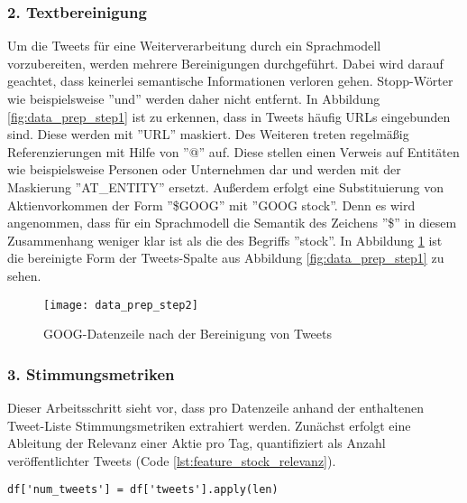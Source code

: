 \subsubsection*{2. Textbereinigung}
Um die Tweets für eine Weiterverarbeitung durch ein Sprachmodell vorzubereiten, werden mehrere Bereinigungen durchgeführt. Dabei wird darauf geachtet, dass keinerlei semantische Informationen verloren gehen. Stopp-Wörter wie beispielsweise ''und'' werden daher nicht entfernt.
In Abbildung \ref{fig:data_prep_step1} ist zu erkennen, dass in Tweets häufig URLs eingebunden sind. Diese werden mit ''URL'' maskiert.
Des Weiteren treten regelmäßig Referenzierungen mit Hilfe von ''@'' auf. Diese stellen einen Verweis auf Entitäten wie beispielsweise Personen oder Unternehmen dar und werden mit der Maskierung ''AT\_ENTITY'' ersetzt. 
Außerdem erfolgt eine Substituierung von Aktienvorkommen der Form ''\$GOOG'' mit ''GOOG stock''. Denn es wird angenommen, dass für ein Sprachmodell die Semantik des Zeichens ''\$'' in diesem Zusammenhang weniger klar ist als die des Begriffs ''stock''. In Abbildung \ref{fig:data_prep_step2} ist die bereinigte Form der Tweets-Spalte aus Abbildung \ref{fig:data_prep_step1} zu sehen.
\begin{figure}[H]
	\texttt{[image: data\_prep\_step2]}
	\caption{GOOG-Datenzeile nach der Bereinigung von Tweets}
	\label{fig:data_prep_step2}
\end{figure}


\subsubsection*{3. Stimmungsmetriken}

Dieser Arbeitsschritt sieht vor, dass pro Datenzeile anhand der enthaltenen Tweet-Liste Stimmungsmetriken extrahiert werden. Zunächst erfolgt eine Ableitung der Relevanz einer Aktie pro Tag, quantifiziert als Anzahl veröffentlichter Tweets (Code \ref{lst:feature_stock_relevanz}).
\begin{lstlisting}[caption={Relevanz quantifiziert als Anzahl-Tweets}, label=lst:feature_stock_relevanz, captionpos=t]
df['num_tweets'] = df['tweets'].apply(len)
\end{lstlisting}


